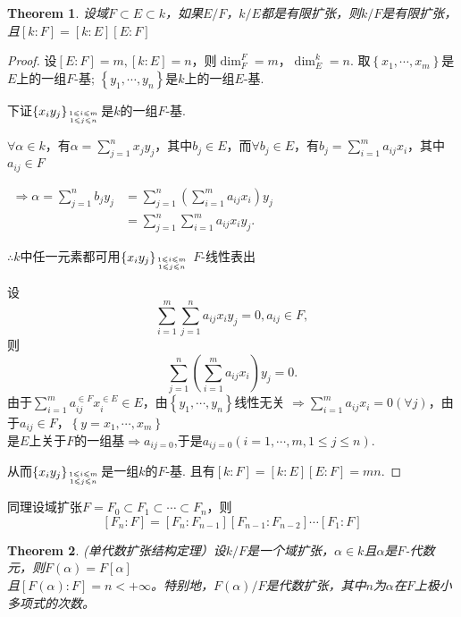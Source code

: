 \documentclass[UTF8]{article}
\newtheorem{thm}{Theorem}[section]
\begin{document}
\begin{thm}设域$F\subset E\subset k$，如果$E/F$，$k/E$都是有限扩张，则$k/F$是有限扩张，且$[k: F]=[k: E][E: F]$
\end{thm}
\begin{proof}设$[E: F]=m, [k: E]=n$，则$\operatorname{dim}_F^F=m$，$\operatorname{dim}_E^k=n.$
取$\left\{x_{1}, \cdots, x_{m}\right\}$是$E$上的一组$F$-基;
$\left\{y_{1}, \cdots, y_{n}\right\}$是$k$上的一组$E$-基.


下证$\left\{ x_iy_j\right\}_{1\leqslant i\leqslant m\atop 1\leqslant j\leqslant n}$是$k$的一组$F$-基.

$\forall\alpha\in k$，有$\alpha=\sum\limits_{j=1}^{n} x_{j} y_{j}$，其中$b_j\in E$，而$\forall b_j\in E$，有$b_j=\sum\limits_{i=1}^{m} a_{ij}x_i$，其中$a_{ij}\in F$
\begin{center}
	
	$\begin{aligned} \Rightarrow\alpha=\sum\limits_{j=1}^{n} b_{j} y_{j} &=\sum\limits_{j=1}^{n}\left(\sum\limits_{i=1}^{m} a_{i j} x_{i}\right) y_{j} \\ &=\sum\limits_{j=1}^{n} \sum\limits_{i=1}^{m} a_{i j} x_{i} y_{j} .\end{aligned}$
\end{center}
$\therefore k$中任一元素都可用$\left\{ x_iy_j\right\}_{1\leqslant i\leqslant m\atop 1\leqslant j\leqslant n}$ $F$-线性表出

设
$$\sum\limits_{i=1}^{m} \sum\limits_{j=1}^{n} a_{i j} x_{i}  y_{j}=0, a_{ij}\in F,$$
则
$$\sum\limits_{j=1}^{n}\left(\sum\limits_{i=1}^{m} a_{ij} x_{i}\right) y_{j}=0.$$
由于$\sum\limits_{i=1}^ma_{ij}^{\in F}x_i^{\in E}\in E$，由$\left\{ y_1,\cdots,y_n\right\}$线性无关
$\Rightarrow\sum\limits_{i=1}^{m} a_{ij} x_{i}=0(\forall j)$，由于$a_{ij}\in F$，$\left\{ y=x_1,\cdots,x_m\right\}$\\是$E$上关于$F$的一组基$\Rightarrow a_{ij=0}$,于是$a_{ij=0}(i=1,\cdots, m, 1\leqslant j\leqslant n)$.

从而$\left\{ x_iy_j\right\}_{1\leqslant i\leqslant m\atop 1\leqslant j\leqslant n}$是一组$k$的$F$-基.
且有$[k: F]=[k: E][E: F]=mn.$
\end{proof}
同理设域扩张$F=F_0\subset F_1\subset \cdots \subset F_n$，则
$$
[F_n: F]=[F_n: F_{n-1}][F_{n-1}: F_{n-2}]\cdots [F_1: F]
$$

\begin{thm}
(单代数扩张结构定理）设$k/F$是一个域扩张，$\alpha\in k$且$\alpha$是$F$-代数元，则$F(\alpha)=F[\alpha]$\\且$[F(\alpha): F]=n<+\infty$。特别地，$F(\alpha)/F$是代数扩张，其中$n$为$\alpha$在$F$上极小多项式的次数。
\end{thm}
\end{document}
